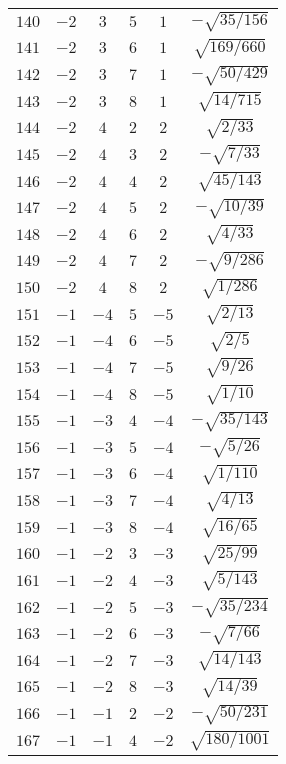 \begin{table}
\begin{center}
\begin{tabular}{|c|c|c|c|c|c|}
$140$ & $-2$ & $3$ & $5$ & $1$ & $-\sqrt{35/156}$ \\ 
$141$ & $-2$ & $3$ & $6$ & $1$ & $\sqrt{169/660}$ \\ 
$142$ & $-2$ & $3$ & $7$ & $1$ & $-\sqrt{50/429}$ \\ 
$143$ & $-2$ & $3$ & $8$ & $1$ & $\sqrt{14/715}$ \\ 
$144$ & $-2$ & $4$ & $2$ & $2$ & $\sqrt{2/33}$ \\ 
$145$ & $-2$ & $4$ & $3$ & $2$ & $-\sqrt{7/33}$ \\ 
$146$ & $-2$ & $4$ & $4$ & $2$ & $\sqrt{45/143}$ \\ 
$147$ & $-2$ & $4$ & $5$ & $2$ & $-\sqrt{10/39}$ \\ 
$148$ & $-2$ & $4$ & $6$ & $2$ & $\sqrt{4/33}$ \\ 
$149$ & $-2$ & $4$ & $7$ & $2$ & $-\sqrt{9/286}$ \\ 
$150$ & $-2$ & $4$ & $8$ & $2$ & $\sqrt{1/286}$ \\ 
$151$ & $-1$ & $-4$ & $5$ & $-5$ & $\sqrt{2/13}$ \\ 
$152$ & $-1$ & $-4$ & $6$ & $-5$ & $\sqrt{2/5}$ \\ 
$153$ & $-1$ & $-4$ & $7$ & $-5$ & $\sqrt{9/26}$ \\ 
$154$ & $-1$ & $-4$ & $8$ & $-5$ & $\sqrt{1/10}$ \\ 
$155$ & $-1$ & $-3$ & $4$ & $-4$ & $-\sqrt{35/143}$ \\ 
$156$ & $-1$ & $-3$ & $5$ & $-4$ & $-\sqrt{5/26}$ \\ 
$157$ & $-1$ & $-3$ & $6$ & $-4$ & $\sqrt{1/110}$ \\ 
$158$ & $-1$ & $-3$ & $7$ & $-4$ & $\sqrt{4/13}$ \\ 
$159$ & $-1$ & $-3$ & $8$ & $-4$ & $\sqrt{16/65}$ \\ 
$160$ & $-1$ & $-2$ & $3$ & $-3$ & $\sqrt{25/99}$ \\ 
$161$ & $-1$ & $-2$ & $4$ & $-3$ & $\sqrt{5/143}$ \\ 
$162$ & $-1$ & $-2$ & $5$ & $-3$ & $-\sqrt{35/234}$ \\ 
$163$ & $-1$ & $-2$ & $6$ & $-3$ & $-\sqrt{7/66}$ \\ 
$164$ & $-1$ & $-2$ & $7$ & $-3$ & $\sqrt{14/143}$ \\ 
$165$ & $-1$ & $-2$ & $8$ & $-3$ & $\sqrt{14/39}$ \\ 
$166$ & $-1$ & $-1$ & $2$ & $-2$ & $-\sqrt{50/231}$ \\ 
$167$ & $-1$ & $-1$ & $4$ & $-2$ & $\sqrt{180/1001}$ \\ 

\end{tabular}
\end{center}
\end{table}
